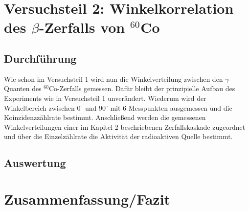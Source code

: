 \documentclass[11pt]{scrartcl}
\begin{document}
\section{Versuchsteil 2: Winkelkorrelation des $\beta$-Zerfalls von $^{60}$Co}

\subsection{Durchführung}

Wie schon im Versuchsteil 1 wird nun die Winkelverteilung zwischen den $\gamma$-Quanten des $^{60}$Co-Zerfalls gemessen. Dafür bleibt der prinzipielle Aufbau des Experiments wie in Versuchsteil 1 unverändert. Wiederum wird der Winkelbereich zwischen 0$^\circ$ und 90$^\circ$ mit 6 Messpunkten ausgemessen und die Koinzidenzzählrate bestimmt. Anschließend werden die gemessenen Winkelverteilungen einer im Kapitel 2 beschriebenen Zerfallskaskade zugeordnet und über die Einzelzählrate die Aktivität der radioaktiven Quelle bestimmt. 

\subsection{Auswertung}




\section{Zusammenfassung/Fazit}




\end{document}
